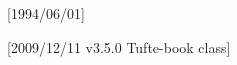 %
[1994/06/01]

[2009/12/11 v3.5.0 Tufte-book class]

\newcommand{\@tufte@class}{book}%
\newcommand{\@tufte@pkgname}{tufte-book}%





\renewcommand\frontmatter{%
  \cleardoublepage%
  \@mainmatterfalse%
  \pagenumbering{arabic}%
  \fancyhf{}%
  \ifthenelse{\boolean{@tufte@twoside}}%
    {\fancyhead[LE,RO]{\thepage}}%
    {\fancyhead[RE,RO]{\thepage}}%
}


\renewcommand\mainmatter{%
  \cleardoublepage%
  \@mainmattertrue%
  \fancyhf{}%
  \ifthenelse{\boolean{@tufte@twoside}}%
    {%
      \renewcommand{\chaptermark}[1]{\markboth{##1}{}}%
      \fancyhead[LE]{\thepage\quad\smallcaps{\newlinetospace{\plaintitle}}}%
      \fancyhead[RO]{\smallcaps{\newlinetospace{\leftmark}}\quad\thepage}%
    }%
    {%
      \fancyhead[RE,RO]{\smallcaps{\newlinetospace{\plaintitle}}\quad\thepage}%
    }%
}


\renewcommand\backmatter{%
  \if@openright%
    \cleardoublepage%
  \else%
    \clearpage%
  \fi%
  \@mainmatterfalse%
}

